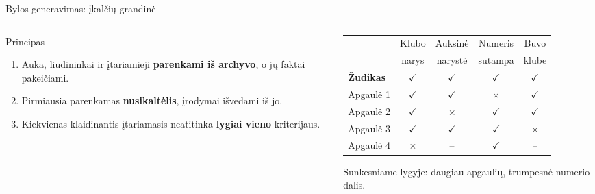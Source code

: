\documentclass[hyperref={breaklinks=true},fleqn,mathserif]{beamer}
\newcommand{\yes}{\textcolor{green!50!black}{$\checkmark$}}
\newcommand{\no}{\textcolor{red!70!black}{$\times$}}
\begin{document}
\begin{frame}{Bylos generavimas: įkalčių grandinė}
\vspace{-2mm}
\begin{columns}[T]
\begin{column}{0.43\textwidth}
\begin{block}{Principas}
\footnotesize
\begin{enumerate}
    \item Auka, liudininkai ir įtariamieji \textbf{parenkami iš archyvo}, o jų faktai pakeičiami.
    \item Pirmiausia parenkamas \textbf{nusikaltėlis}, įrodymai išvedami iš jo.
    \item Kiekvienas klaidinantis įtariamasis neatitinka \textbf{lygiai vieno} kriterijaus.
\end{enumerate}
\end{block}
\end{column}
\begin{column}{0.55\textwidth}
\scriptsize
\setlength{\tabcolsep}{3pt}
\begin{tabular}{@{}lcccc@{}}
\toprule
 & Klubo & Auksinė & Numeris & Buvo \\
 & narys & narystė & sutampa & klube \\
\midrule
\textbf{Žudikas} & \yes & \yes & \yes & \yes \\
Apgaulė 1 & \yes & \yes & \no & \yes \\
Apgaulė 2 & \yes & \no & \yes & \yes \\
Apgaulė 3 & \yes & \yes & \yes & \no \\
Apgaulė 4 & \no & -- & \yes & -- \\
\bottomrule
\end{tabular}
\par\smallskip
{\scriptsize Sunkesniame lygyje: daugiau apgaulių, trumpesnė numerio dalis.}
\end{column}
\end{columns}

\end{frame}
\end{document}
